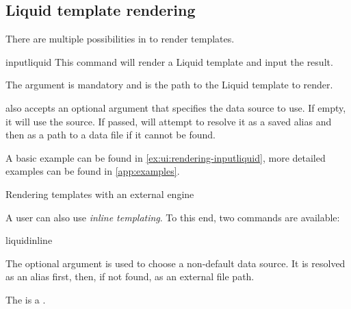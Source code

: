 \subsection{Liquid template rendering}

There are multiple possibilities in \lqt{} to render templates. %

\begin{docCommand}[doc updated=2025-11-21]{inputliquid}{}
  This command will render a Liquid template and input the result. %

  The  argument is mandatory and is the path to the
  Liquid template to render. %

   also accepts an optional argument that specifies the
  data source to use. %
  If empty, it will use the  source. %
  If passed, \lqt{} will attempt to resolve it as a saved alias and then as
  a path to a data file if it cannot be found. %
\end{docCommand}

A basic example can be found in \cref{ex:ui:rendering-inputliquid}, more
detailed examples can be found in \cref{app:examples}. %

\begin{dbexample}[label=ex:ui:rendering-inputliquid]{Rendering templates with an external engine}{}
\begin{preamblecode}
  \usepackage[
    engine       = external,
    engine-conf  = { path = /path/to/renderer },
    data         = cv.yml,
    data-sources = { random = data/facts.yml },
    outdir       = liquidtex-cache
    ]{liquidtex}
\end{preamblecode}
\begin{bodycode}


\end{bodycode}
\end{dbexample}

A user can also use \emph{inline templating}. %
To this end, two commands are available: %

\begin{docCommand}[doc
  new=2025-11-21]{liquidinline}{}{}

  The optional argument  is used to
  choose a non-default data source. %
  It is resolved as an alias first, then, if not found, as an external file
  path. %

  The  is a . %
\end{docCommand}


